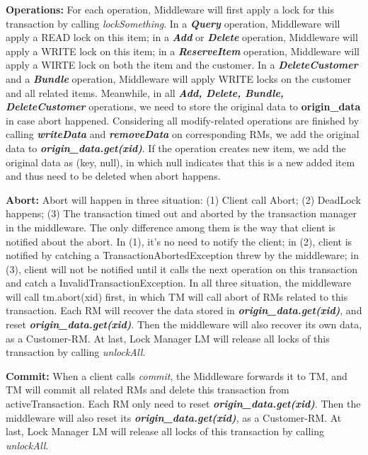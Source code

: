 \documentclass[a4paper, 12pt]{article}
\begin{document}
\textbf{Operations:} For each operation, Middleware will first apply a lock for this transaction by calling \textit{lockSomething}. In a \textbf{\textit{Query}} operation, Middleware will apply a READ lock on this item; in a \textbf{\textit{Add}} or \textbf{\textit{Delete}} operation, Middleware will apply a WRITE lock on this item; in a \textbf{\textit{ReserveItem}} operation, Middleware will apply a WIRTE lock on both the item and the customer. In a \textbf{\textit{DeleteCustomer}} and a \textbf{\textit{Bundle}} operation, Middleware will apply WRITE locks on the customer and all related items. Meanwhile, in all \textbf{\textit{Add, Delete, Bundle, DeleteCustomer}} operations, we need to store the original data to \textbf{origin\_data} in case abort happened. Considering all modify-related operations are finished by calling \textbf{\textit{writeData}} and \textbf{\textit{removeData}} on corresponding RMs, we add the original data to \textbf{\textit{origin\_data.get(xid)}}. If the operation creates new item, we add the original data as (key, null), in which null indicates that this is a new added item and thus need to be deleted when abort happens. 

\textbf{Abort:} Abort will happen in three situation: (1) Client call Abort; (2) DeadLock happens; (3) The transaction timed out and aborted by the transaction manager in the middleware. The only difference among them is the way that client is notified about the abort. In (1), it's no need to notify the client; in (2), client is notified by catching a TransactionAbortedException threw by the middleware; in (3), client will not be notified until it calls the next operation on this transaction and catch a InvalidTransactionException. In all three situation, the middleware will call tm.abort(xid) first, in which TM will call abort of RMs related to this transaction. Each RM will recover the data stored in \textbf{\textit{origin\_data.get(xid)}}, and reset \textbf{\textit{origin\_data.get(xid)}}. Then the middleware will also recover its own data, as a Customer-RM. At last, Lock Manager LM will release all locks of this transaction by calling \textit{unlockAll}.

\textbf{Commit:} When a client calls \textit{commit}, the Middleware forwards it to TM, and TM will commit all related RMs and delete this transaction from activeTransaction. Each RM only need to reset \textbf{\textit{origin\_data.get(xid)}}. Then the middleware will also reset its \textbf{\textit{origin\_data.get(xid)}}, as a Customer-RM. At last, Lock Manager LM will release all locks of this transaction by calling \textit{unlockAll}.
\end{document}
